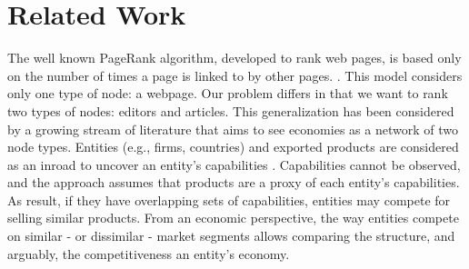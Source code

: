 \section{Related Work}


The well known PageRank algorithm, developed to rank web pages, is based only on the number of times a page is linked to by other pages. \cite{page1999pagerank}. This model considers only one type of node: a webpage.  Our problem differs in that we want to rank two types of nodes: editors and articles. This generalization has been considered by a growing stream of literature that aims to see economies as a network of two node types. Entities (e.g., firms, countries) and exported products are considered as an inroad to uncover an entity's capabilities \cite{hidalgo2007}. Capabilities cannot be observed, and the approach assumes that products are a proxy of each entity's capabilities. As result, if they have overlapping sets of capabilities, entities may compete for selling similar products. From an economic perspective, the way entities compete on similar - or dissimilar - market segments allows comparing the structure, and arguably, the competitiveness an entity's economy. 

